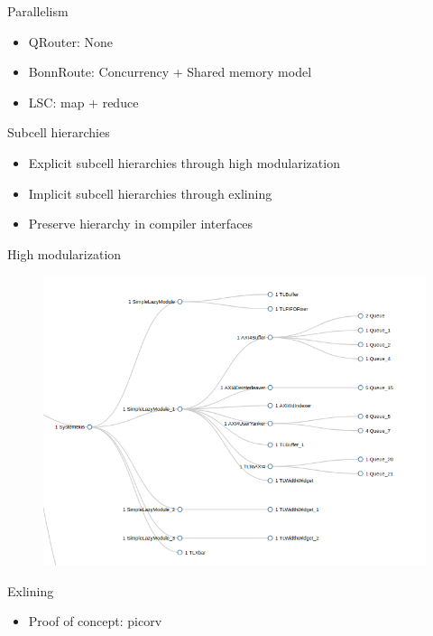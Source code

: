 \documentclass[9pt]{beamer}
\begin{document}
\begin{frame}{Parallelism}
	\begin{itemize}
        \setlength\itemsep{1em}
		\item QRouter: None 
		\item BonnRoute: Concurrency + Shared memory model
		\item LSC: map + reduce
	\end{itemize}
\end{frame}

\begin{frame}{Subcell hierarchies}
	\begin{itemize}
        \setlength\itemsep{1em}
		\item Explicit subcell hierarchies through high modularization
		\item Implicit subcell hierarchies through exlining
		\item Preserve hierarchy in compiler interfaces
	\end{itemize}
\end{frame}

\begin{frame}{High modularization}
       \begin{figure}
        \centering
        \includegraphics[scale=0.38]{SystemBus.png}
       \end{figure}
\end{frame}

\begin{frame}{Exlining}
	\begin{itemize}
        \setlength\itemsep{1em}
		\item Proof of concept: picorv
	\end{itemize}
\end{frame}
\end{document}
